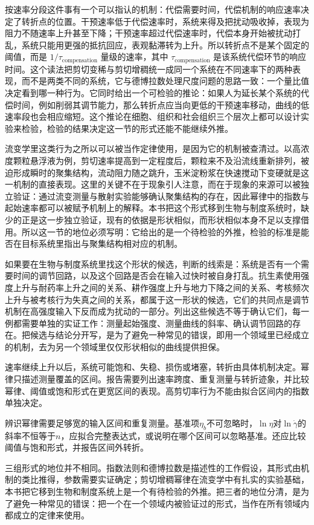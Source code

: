 按速率分段这件事有一个可以指认的机制：代偿需要时间，代偿机制的响应速率决定了转折点的位置。干预速率低于代偿速率时，系统来得及把扰动吸收掉，表现为阻力不随速率上升甚至下降；干预速率超过代偿速率时，代偿本身开始被扰动打乱，系统只能用更强的抵抗回应，表观黏滞转为上升。所以转折点不是某个固定的阈值，而是 $1/\tau_{\text{compensation}}$ 量级的速率，其中 $\tau_{\text{compensation}}$ 是该系统代偿环节的响应时间。这个读法把剪切变稀与剪切增稠统一成同一个系统在不同速率下的两种表现，而不是两类不同的系统，它与德博拉数处理尺度问题的思路一致：一个量比值决定看到哪一种行为。它同时给出一个可检验的推论：如果人为延长某个系统的代偿时间，例如削弱其调节能力，那么转折点应当向更低的干预速率移动，曲线的低速率段也会相应缩短。这个推论在细胞、组织和社会组织三个层次上都可以设计实验来检验，检验的结果决定这一节的形式还能不能继续外推。

流变学里这类行为之所以可以被当作定律使用，是因为它的机制被查清过。以高浓度颗粒悬浮液为例，剪切速率提高到一定程度后，颗粒来不及沿流线重新排列，被迫形成瞬时的聚集结构，流动阻力随之跳升，玉米淀粉浆在快速搅动下变硬就是这一机制的直接表现。这里的关键不在于现象引人注意，而在于现象的来源可以被独立验证：通过流变测量与散射实验能够确认聚集结构的存在，因此幂律中的指数与起始速率都可以被赋予机制上的解释。本书把这个形式移到生物与制度系统时，缺少的正是这一步独立验证，现有的依据是形状相似，而形状相似本身不足以支撑借用。所以这一节的地位必须写明：它给出的是一个待检验的外推，检验的标准是能否在目标系统里指出与聚集结构相对应的机制。

如果要在生物与制度系统里找这个形状的候选，判断的线索是：系统是否有一个需要时间的调节回路，以及这个回路是否会在输入过快时被自身打乱。抗生素使用强度上升与耐药率上升之间的关系、耕作强度上升与地力下降之间的关系、考核频次上升与被考核行为失真之间的关系，都属于这一形状的候选，它们的共同点是调节机制在高强度输入下反而成为扰动的一部分\cite{laxminarayan2013antibiotic}。列出这些候选不等于确认它们，每一例都需要单独的实证工作：测量起始强度、测量曲线的斜率、确认调节回路的存在。把候选与结论分开写，是为了避免一种常见的错误，即用一个领域里已经成立的机制，去为另一个领域里仅仅形状相似的曲线提供担保。

速率继续上升以后，系统可能饱和、失稳、损伤或堵塞，转折由具体机制决定。幂律只描述测量覆盖的区间。报告需要列出速率跨度、重复测量与转折迹象，并比较幂律、阈值或饱和形式在更宽区间的表现。高剪切率行为不能由拟合区间内的指数单独决定。

辨识幂律需要足够宽的输入区间和重复测量。基准项$\eta_b$不可忽略时，$\ln\eta$对$\ln\dot\gamma$的斜率不恒等于$n$，应拟合完整表达式，或说明在哪个区间可以忽略基准。还应比较阈值与饱和形式，并报告区间外转折。

三组形式的地位并不相同。指数法则和德博拉数是描述性的工作假设，其形式由机制的类比推得，参数需要实证确定；剪切增稠幂律在流变学中有扎实的实验基础，本书把它移到生物和制度系统上是一个有待检验的外推。把三者的地位分清，是为了避免一种常见的错误：把一个在一个领域内被验证过的形式，当作在所有领域内都成立的定律来使用。

